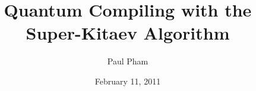 \documentclass[twocolumn,10pt]{article}
\title{Quantum Compiling with the Super-Kitaev Algorithm}
\date{February 11, 2011}
\author{Paul Pham}
\theoremstyle{plain}
\begin{document}
\newcommand{\braket}[2]{\langle #1|#2 \rangle}
\newcommand{\normtwo}{\frac{1}{\sqrt{2}}}
\newcommand{\norm}[1]{\parallel #1 \parallel}

\maketitle







%





%











\end{document}
